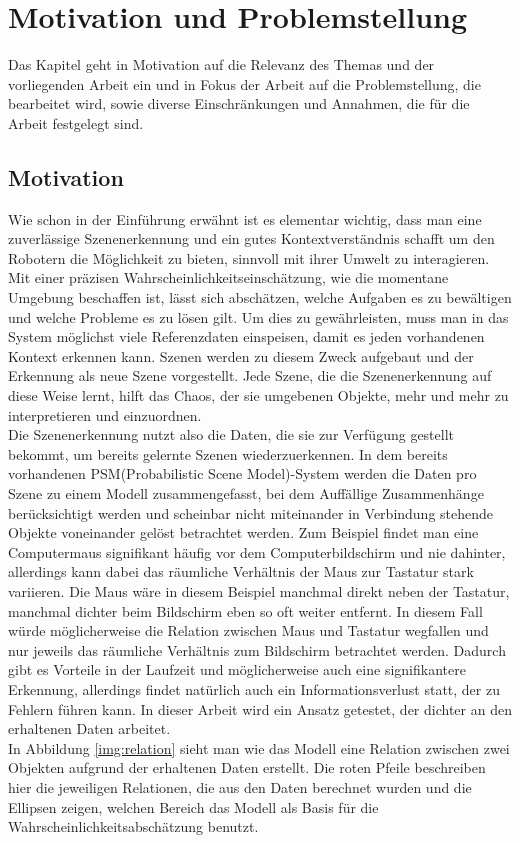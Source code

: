 \chapter{Motivation und Problemstellung}\label{ch:motivation}
Das Kapitel geht in Motivation auf die Relevanz des Themas und der vorliegenden Arbeit ein und in Fokus der Arbeit auf die Problemstellung, die bearbeitet wird, sowie diverse Einschränkungen und Annahmen, die für die Arbeit festgelegt sind.

\section{Motivation}
Wie schon in der Einführung erwähnt ist es elementar wichtig, dass man eine zuverlässige Szenenerkennung und ein gutes Kontextverständnis schafft um den Robotern die Möglichkeit zu bieten, sinnvoll mit ihrer Umwelt zu interagieren. Mit einer präzisen Wahrscheinlichkeitseinschätzung, wie die momentane Umgebung beschaffen ist, lässt sich abschätzen, welche Aufgaben es zu bewältigen und welche Probleme es zu lösen gilt. Um dies zu gewährleisten, muss man in das System möglichst viele Referenzdaten einspeisen, damit es jeden vorhandenen Kontext erkennen kann. Szenen werden zu diesem Zweck aufgebaut und der Erkennung als neue Szene vorgestellt. Jede Szene, die die Szenenerkennung auf diese Weise lernt, hilft das Chaos, der sie umgebenen Objekte, mehr und mehr zu interpretieren und einzuordnen.\cite{mehopa07}\smallskip\\
Die Szenenerkennung nutzt also die Daten, die sie zur Verfügung gestellt bekommt, um bereits gelernte Szenen wiederzuerkennen. In dem bereits vorhandenen PSM(Probabilistic Scene Model)-System werden die Daten pro Szene zu einem Modell zusammengefasst, bei dem Auffällige Zusammenhänge berücksichtigt werden und scheinbar nicht miteinander in Verbindung stehende Objekte voneinander gelöst betrachtet werden. Zum Beispiel findet man eine Computermaus signifikant häufig vor dem Computerbildschirm und nie dahinter, allerdings kann dabei das räumliche Verhältnis der Maus zur Tastatur stark variieren. Die Maus wäre in diesem Beispiel manchmal direkt neben der Tastatur, manchmal dichter beim Bildschirm eben so oft weiter entfernt. In diesem Fall würde möglicherweise die Relation zwischen Maus und Tastatur wegfallen und nur jeweils das räumliche Verhältnis zum Bildschirm betrachtet werden. Dadurch gibt es Vorteile in der Laufzeit und möglicherweise auch eine signifikantere Erkennung, allerdings findet natürlich auch ein Informationsverlust statt, der zu Fehlern führen kann. In dieser Arbeit wird ein Ansatz getestet, der dichter an den erhaltenen Daten arbeitet.\smallskip\\
In Abbildung \ref{img:relation} sieht man wie das Modell eine Relation zwischen zwei Objekten aufgrund der erhaltenen Daten erstellt. Die roten Pfeile beschreiben hier die jeweiligen Relationen, die aus den Daten berechnet wurden und die Ellipsen zeigen, welchen Bereich das Modell als Basis für die Wahrscheinlichkeitsabschätzung benutzt.

